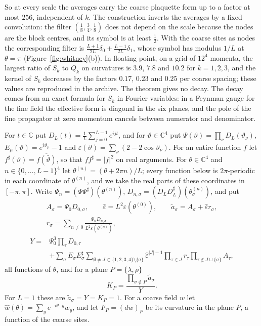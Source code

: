 \documentclass[11pt]{amsart}
\theoremstyle{definition}
\theoremstyle{remark}
\numberwithin{equation}{section}
\newcommand{\C}{\mathbb{C}}
\begin{document}
So at every scale the averages carry the coarse plaquette form up to a
factor at most $256$, independent of $k$. The construction inverts the
averages by a fixed convolution: the filter $(\frac18,\frac34,\frac18)$ does
not depend on the scale because the nodes are the block centres, and its
symbol is at least $\frac12$. With the coarse sites as nodes the
corresponding filter is $\frac{L+1}{2L}\delta_0+\frac{L-1}{2L}\delta_1$,
whose symbol has modulus $1/L$ at $\theta=\pi$ (Figure~\ref{fig:whitney}(b)). In floating
point, on a grid of $12^4$ momenta, the largest ratio of $S_k$ to $Q_k$ on
curvatures is $3.9$, $7.8$ and $10.2$ for $k=1,2,3$, and the kernel of $S_k$
decreases by the factors $0.17$, $0.23$ and $0.25$ per coarse spacing; these
values are reproduced in the archive.
The theorem gives no decay. The decay comes from an exact formula for $S_k$
in Fourier variables: in a Feynman gauge for the fine field the effective
form is diagonal in the six planes, and the pole of the fine propagator at
zero momentum cancels between numerator and denominator.

For $t\in\C$ put $D_L(t)=\frac1L\sum_{j=0}^{L-1}e^{ijt}$, and for
$\vartheta\in\C^4$ put $\Psi(\vartheta)=\prod_\nu D_L(\vartheta_\nu)$,
$E_\mu(\vartheta)=e^{i\vartheta_\mu}-1$ and $\varepsilon(\vartheta)=
\sum_\nu(2-2\cos\vartheta_\nu)$. For an entire function $f$ let
$f^\sharp(\vartheta)=\overline{f(\bar\vartheta)}$, so that $ff^\sharp=|f|^2$
on real arguments. For $\theta\in\C^4$ and $n\in\{0,\dots,L-1\}^4$ let
$\theta^{(n)}=(\theta+2\pi n)/L$; every function below is $2\pi$-periodic in
each coordinate of $\theta^{(n)}$, and we take the real parts of these
coordinates in $[-\pi,\pi]$. Write $\Psi_n=(\Psi\Psi^\sharp)(\theta^{(n)})$,
$D_{n,\sigma}=(D_LD_L^\sharp)(\theta^{(n)}_\sigma)$, and put
\begin{gather*}
A_\sigma=\Psi_0D_{0,\sigma},\qquad\hat\varepsilon=L^2\varepsilon(
\theta^{(0)}),\qquad\tilde a_\sigma=A_\sigma+\hat\varepsilon r_\sigma,\\
r_\sigma=\sum_{n\ne0}\frac{\Psi_nD_{n,\sigma}}{L^2\varepsilon(\theta^{(n)})},
\end{gather*}
\begin{equation}\label{eq:Yk}
\begin{split}
Y={}&\Psi_0^3\prod_\tau D_{0,\tau}\\
&+\sum_\sigma E_\sigma E^\sharp_\sigma\sum_{\emptyset\ne J\subset\{1,2,3,4\}
\setminus\{\sigma\}}\hat\varepsilon^{|J|-1}\prod_{\tau\in J}r_\tau
\prod_{\tau\notin J\cup\{\sigma\}}A_\tau ,
\end{split}
\end{equation}
all functions of $\theta$, and for a plane $P=\{\lambda,\rho\}$
\[
K_P=\frac{\prod_{\sigma\notin P}\tilde a_\sigma}{Y}.
\]
For $L=1$ these are $\tilde a_\sigma=Y=K_P=1$. For a coarse field $w$ let
$\hat w(\theta)=\sum_ye^{-i\theta\cdot y}w_y$, and let $F_P=(dw)_P$ be its
curvature in the plane $P$, a function of the coarse sites.
\end{document}
